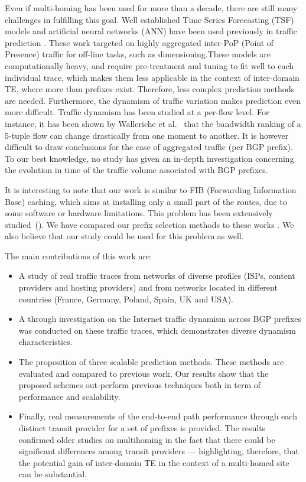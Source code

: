 \documentclass[10pt, conference,letterpaper]{IEEEtran}
\begin{document}
Even if multi-homing has been used for more than a decade, there are still many challenges in fulfilling this goal.
Well established Time Series Forecasting (TSF) models and artificial neural networks (ANN) have been used previously in traffic prediction \cite{Papagiannaki2005, Cortez2006, Otoshi2013}.
These work targeted on highly aggregated inter-PoP (Point of Presence) traffic for off-line tasks, such as dimensioning.These models are computationally heavy, and require pre-treatment and tuning to fit well to each individual trace, which makes them less applicable in the context of inter-domain TE, where more than  prefixes exist. Therefore, less complex prediction methods are needed. 
Furthermore, the dynamism of traffic variation makes prediction even more difficult. Traffic dynamism has been studied at a per-flow level. For instance, it has  been shown by Walleriche et al.~\cite{Wallerich2006} that the bandwidth ranking of a 5-tuple flow can change drastically from one moment to another. It is however difficult to draw conclusions for the case of aggregated traffic (per BGP prefix). To our best knowledge, no study has given an in-depth investigation concerning the evolution in time of the traffic volume associated with BGP prefixes.

It is interesting to note that our work is similar to FIB (Forwarding Information Base) caching, which aims at installing only a small part of the routes, due to some software or hardware limitations. This problem has been extensively studied~(\cite{Iannone2007, Ballani2009, Kim2009, Zhang2012, Sarrar2012, Liu2015}).
 We have compared our prefix selection methods to these works . We also believe that our study could be used for this problem as well. 


The main contributions of this work are:
\begin{itemize}
\item A study of real  traffic traces from networks of diverse profiles (ISPs, content providers and hosting providers) and from networks located in different countries (France, Germany, Poland, Spain, UK and USA).
\item A through investigation on the Internet traffic dynamism across BGP prefixes was conducted on these traffic traces, which demonstrates diverse dynamism characteristics.
\item The proposition of three scalable prediction methods. These methods are evaluated and compared to previous work. Our results show that the proposed schemes out-perform previous techniques both in term of performance and scalability. 
\item Finally, real measurements of the end-to-end path performance through each distinct transit provider for a set of prefixes is provided. The results confirmed older studies on multihoming in the fact that there could be significant differences among transit providers --- highlighting, therefore, that the potential gain of inter-domain TE in the context of a multi-homed site can be substantial. 
\end{itemize}
\end{document}
